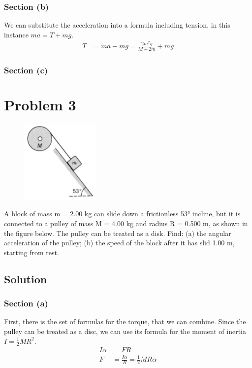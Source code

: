 \documentclass[12pt]{article}
\begin{document}
\subsubsection{Section (b)}
We can substitute the acceleration into a formula including tension, in this instance \(ma = T + mg\).
\begin{align}
    T   &=  ma - mg
        =   \frac{2m^2g}{M + 2m} + mg
\end{align}

\subsubsection{Section (c)}


\pagebreak

\section{Problem 3}
\begin{figure}
    \vspace{-30pt}
    \includegraphics[width=0.35\textwidth]{graph_3.png} 
\end{figure}
A block of mass m = 2.00 kg can slide down a frictionless 53\unit{\degree} incline, but it is connected to a pulley of mass M = 4.00 kg and radius R = 0.500 m, as shown in the figure below. The pulley can be treated as a disk. Find: (a) the angular acceleration of the pulley; (b) the speed of the block after it has slid 1.00 m, starting from rest.

\subsection{Solution}
\subsubsection{Section (a)}
First, there is the set of formulas for the torque, that we can combine. Since the pulley can be treated as a disc, we can use its formula for the moment of inertia \(I = \frac{1}{2}MR^2\).
\begin{align}
    I\alpha &=  F R\\
    F   &=  \frac{I\alpha}{R}
        =   \frac{1}{2}MR\alpha
\end{align}
\end{document}
